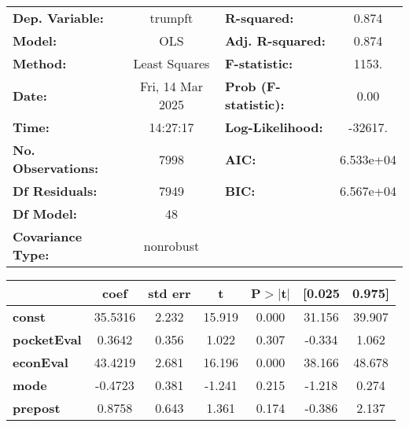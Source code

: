 \begin{center}
\begin{tabular}{lclc}
\toprule
\textbf{Dep. Variable:}         &     trumpft      & \textbf{  R-squared:         } &     0.874   \\
\textbf{Model:}                 &       OLS        & \textbf{  Adj. R-squared:    } &     0.874   \\
\textbf{Method:}                &  Least Squares   & \textbf{  F-statistic:       } &     1153.   \\
\textbf{Date:}                  & Fri, 14 Mar 2025 & \textbf{  Prob (F-statistic):} &     0.00    \\
\textbf{Time:}                  &     14:27:17     & \textbf{  Log-Likelihood:    } &   -32617.   \\
\textbf{No. Observations:}      &        7998      & \textbf{  AIC:               } & 6.533e+04   \\
\textbf{Df Residuals:}          &        7949      & \textbf{  BIC:               } & 6.567e+04   \\
\textbf{Df Model:}              &          48      & \textbf{                     } &             \\
\textbf{Covariance Type:}       &    nonrobust     & \textbf{                     } &             \\
\bottomrule
\end{tabular}
\begin{tabular}{lcccccc}
                                & \textbf{coef} & \textbf{std err} & \textbf{t} & \textbf{P$> |$t$|$} & \textbf{[0.025} & \textbf{0.975]}  \\
\midrule
\textbf{const}                  &      35.5316  &        2.232     &    15.919  &         0.000        &       31.156    &       39.907     \\
\textbf{pocketEval}             &       0.3642  &        0.356     &     1.022  &         0.307        &       -0.334    &        1.062     \\
\textbf{econEval}               &      43.4219  &        2.681     &    16.196  &         0.000        &       38.166    &       48.678     \\
\textbf{mode}                   &      -0.4723  &        0.381     &    -1.241  &         0.215        &       -1.218    &        0.274     \\
\textbf{prepost}                &       0.8758  &        0.643     &     1.361  &         0.174        &       -0.386    &        2.137     \\

\end{tabular}
\end{center}
